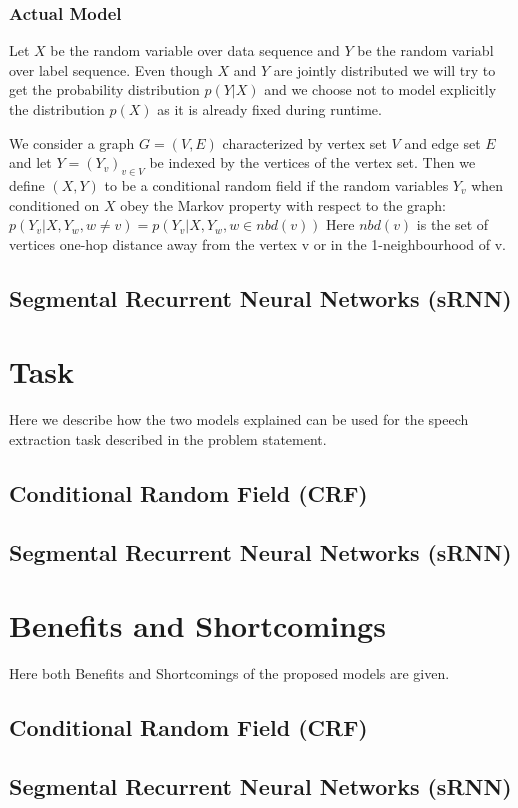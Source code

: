 \documentclass[letterpaper]{article} %
\begin{document}
\subsubsection{Actual Model}
Let $X$ be the random variable over data sequence and $Y$ be the random variabl over label sequence. Even though $X$ and $Y$ are jointly distributed we will try to get the probability distribution $p(Y|X)$ and we choose not to model explicitly the distribution $p(X)$ as it is already fixed during runtime.

We consider a graph $G=(V,E)$ characterized by vertex set $V$ and edge set $E$ and let $Y = (Y_v)_{v \in V}$ be indexed by the vertices of the vertex set. Then we define $(X, Y)$ to be a conditional random field if the random variables $Y_v$ when conditioned on $X$ obey the Markov property with respect to the graph: $p(Y_v | X, Y_w, w \ne v) = p(Y_v | X, Y_w, w \in nbd(v))$ Here $nbd(v)$ is the set of vertices one-hop distance away from the vertex v or in the 1-neighbourhood of v.
\subsection{Segmental Recurrent Neural Networks (sRNN)}

\section{Task}
Here we describe how the two models explained can be used for the speech extraction task described in the problem statement.
\subsection{Conditional Random Field (CRF)}

\subsection{Segmental Recurrent Neural Networks (sRNN)}

\section{Benefits and Shortcomings}
Here both Benefits and Shortcomings of the proposed models are given.
\subsection{Conditional Random Field (CRF)}
\subsection{Segmental Recurrent Neural Networks (sRNN)}



\end{document}
